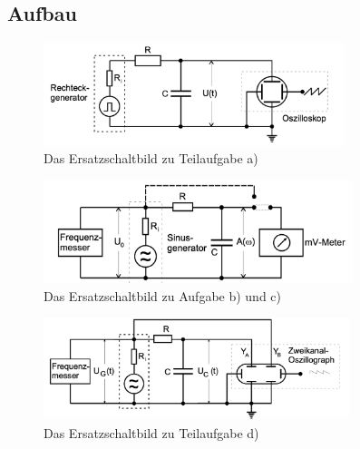 \subsection{Aufbau}
\label{subsec:Aufbau}

\begin{figure}
    
    \centering
    \includegraphics[height=3cm]{content/esb1.png}
    \caption{Das Ersatzschaltbild zu Teilaufgabe a)}
    \label{fig:esb1}
\end{figure}

\begin{figure}
    
    \centering
    \includegraphics[height=3cm]{content/esb2.png}
    \caption{Das Ersatzschaltbild zu Aufgabe b) und c)}
    \label{fig:esb2}
\end{figure}

\begin{figure}
    
    \centering
    \includegraphics[height=3cm]{content/esb3.png}
    \caption{Das Ersatzschaltbild zu Teilaufgabe d)}
    \label{fig:esb3}
\end{figure}